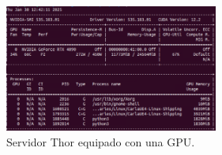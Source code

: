\begin{figure}[ht]
  \centering
  \includegraphics[width=7cm]{figs/Plataformas_Desarollo/thor.png}
  \caption{Servidor Thor equipado con una \ac{GPU}.}
  \label{fig:thor_nvidia}
\end{figure}









